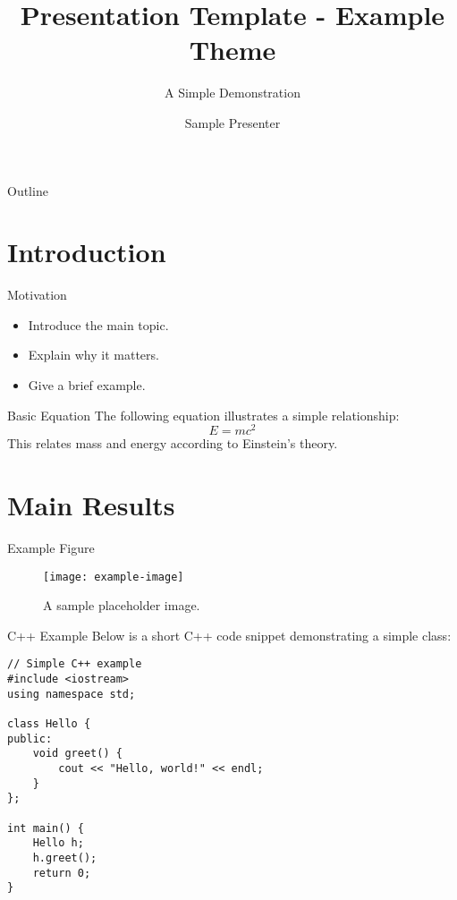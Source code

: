 \documentclass{presentation}
\title[Sample Theme]{Presentation Template - Example Theme}
\subtitle{A Simple Demonstration}
\author{Sample Presenter}
\institute[Sample Univ]{sample@example.edu}
\begin{document}
\begin{frame}
    \titlepage
\end{frame}

\begin{frame}{Outline}
    \tableofcontents
\end{frame}

\section{Introduction}

\begin{frame}{Motivation}
    \begin{itemize}
        \item Introduce the main topic.
        \item Explain why it matters.
        \item Give a brief example.
    \end{itemize}
\end{frame}

\begin{frame}{Basic Equation}
    The following equation illustrates a simple relationship:
    \[
        E = mc^2
    \]
    This relates mass and energy according to Einstein’s theory.
\end{frame}

\section{Main Results}

\begin{frame}{Example Figure}
    \begin{figure}
        \centering
        \texttt{[image: example-image]}
        \caption{A sample placeholder image.}
    \end{figure}
\end{frame}

\begin{frame}[fragile]{C++ Example}
    Below is a short C++ code snippet demonstrating a simple class:

    \begin{lstlisting}
// Simple C++ example
#include <iostream>
using namespace std;

class Hello {
public:
    void greet() {
        cout << "Hello, world!" << endl;
    }
};

int main() {
    Hello h;
    h.greet();
    return 0;
}
\end{lstlisting}
\end{frame}
\end{document}
